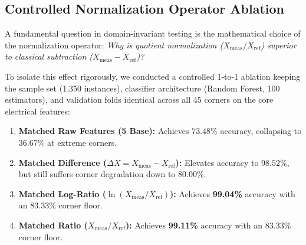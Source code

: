 \documentclass[conference]{IEEEtran}
\begin{document}
\subsection{Controlled Normalization Operator Ablation}
A fundamental question in domain-invariant testing is the mathematical choice of the normalization operator: \textit{Why is quotient normalization ($X_{\text{meas}}/X_{\text{ref}}$) superior to classical subtraction ($X_{\text{meas}} - X_{\text{ref}}$)?}

To isolate this effect rigorously, we conducted a controlled 1-to-1 ablation keeping the sample set (1,350 instances), classifier architecture (Random Forest, 100 estimators), and validation folds identical across all 45 corners on the core electrical features:
\begin{enumerate}
    \item \textbf{Matched Raw Features (5 Base):} Achieves $73.48\%$ accuracy, collapsing to $36.67\%$ at extreme corners.
    \item \textbf{Matched Difference ($\Delta X = X_{\text{meas}} - X_{\text{ref}}$):} Elevates accuracy to $98.52\%$, but still suffers corner degradation down to $80.00\%$.
    \item \textbf{Matched Log-Ratio ($\ln(X_{\text{meas}} / X_{\text{ref}})$):} Achieves \textbf{99.04\%} accuracy with an $83.33\%$ corner floor.
    \item \textbf{Matched Ratio ($X_{\text{meas}} / X_{\text{ref}}$):} Achieves \textbf{99.11\%} accuracy with an $83.33\%$ corner floor.
\end{enumerate}

\begin{table}[t]
\centering
\caption{Controlled Feature Normalization Ablation Under 45-Corner LOCO}
\label{tab:ablation}
\end{table}
\end{document}
